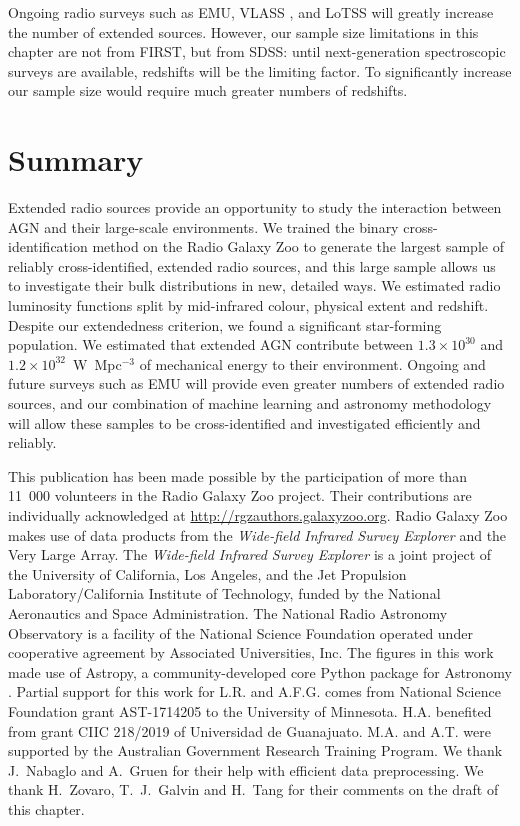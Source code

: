     Ongoing radio surveys such as EMU, VLASS \citep{lacy20vlass}, and LoTSS \citep{shimwell19lotss} will greatly increase the number of extended sources. However, our sample size limitations in this chapter are not from FIRST, but from SDSS: until next-generation spectroscopic surveys are available, redshifts will be the limiting factor. To significantly increase our sample size would require much greater numbers of redshifts.

\section{Summary}\label{sec:summary}

  Extended radio sources provide an opportunity to study the interaction between AGN and their large-scale environments. We trained the binary cross-identification method on the Radio Galaxy Zoo to generate the largest sample of reliably cross-identified, extended radio sources, and this large sample allows us to investigate their bulk distributions in new, detailed ways. We estimated radio luminosity functions split by mid-infrared colour, physical extent and redshift. Despite our extendedness criterion, we found a significant star-forming population. We estimated that extended AGN contribute between $1.3 \times 10^{30}$ and $1.2 \times 10^{32}$~W~Mpc$^{-3}$ of mechanical energy to their environment. Ongoing and future surveys such as EMU will provide even greater numbers of extended radio sources, and our combination of machine learning and astronomy methodology will allow these samples to be cross-identified and investigated efficiently and reliably.


This publication has been made possible by the participation of more than
11~000 volunteers in the Radio Galaxy Zoo project. Their contributions are
individually acknowledged at \url{http://rgzauthors.galaxyzoo.org}. Radio
Galaxy Zoo makes use of data products from the \emph{Wide-field Infrared Survey
Explorer} and the Very Large Array. The \emph{Wide-field Infrared Survey Explorer}
is a joint project of the University of California, Los Angeles, and the Jet
Propulsion Laboratory/California Institute of Technology, funded by the
National Aeronautics and Space Administration. The National Radio Astronomy
Observatory is a facility of the National Science Foundation operated under
cooperative agreement by Associated Universities, Inc. The figures in this
work made use of Astropy, a community-developed core Python package for
Astronomy \citep{astropy18}. Partial support for this work for L.R. and A.F.G. comes from National Science Foundation grant AST-1714205 to the University of Minnesota. H.A. benefited from grant CIIC 218/2019 of Universidad de Guanajuato. M.A. and A.T. were supported by the Australian Government Research Training Program. We thank J.~Nabaglo and A.~Gruen for their help with efficient data preprocessing. We thank H.~Zovaro, T.~J.~Galvin and H.~Tang for their comments on the draft of this chapter.


